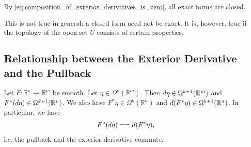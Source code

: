 \documentclass[notoc,notitlepage]{tufte-book}
\begin{document}
\begin{note}
  By \cref{eq:composition_of_exterior_derivatives_is_zero}, all exact forms are closed.

  This is not true in general: a closed form need not be exact. It is, however, true if
  the topology of the open set $U$ consists of certain properties.
\end{note}

\subsection{Relationship between the Exterior Derivative and the Pullback}%
\label{sub:relationship_between_the_exterior_derivative_and_the_pullback}

\begin{propo}\label{propo:commutativity_of_the_pullback_and_the_exterior_derivative}
  Let $F : \mathbb{R}^n \to \mathbb{R}^m$ be smooth. Let $\eta \in
  \Omega^k(\mathbb{R}^m)$. Then $\mathop{}\!d{\eta} \in \Omega^{k + 1}(\mathbb{R}^m)$ and $F^*
  (\mathop{}\!d{\eta}) \in \Omega^{k + 1}(\mathbb{R}^n)$. We also have $F^* \eta \in
  \Omega^k(\mathbb{R}^n)$ and $\mathop{}\!d{(F^* \eta)} \in \Omega^{k + 1}(\mathbb{R}^n)$. In
  particular, we have
  \begin{equation*}
    F^* (\mathop{}\!d{\eta}) = = \mathop{}\!d{(F^* \eta)},
  \end{equation*}
  i.e. the pullback and the exterior derivative commute.
\end{propo}
\end{document}
